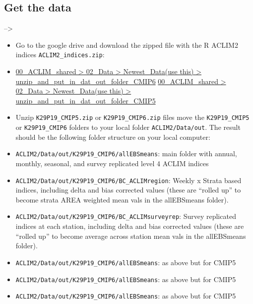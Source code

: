 \documentclass[
]{article}
\begin{document}
\hypertarget{get-the-data}{%
\subsection{Get the data}\label{get-the-data}}

--\textgreater{}

\begin{itemize}
\item
  Go to the google drive and download the zipped file with the R ACLIM2
  indices \texttt{ACLIM2\_indices.zip}:
\item
  \href{https://drive.google.com/drive/u/1/folders/1clPtrPCQMPcwqr8UE78_Sd2IGwyBuDcD}{00\_ACLIM\_shared
  \textgreater{} 02\_Data \textgreater{} Newest\_Data(use this)
  \textgreater{} unzip\_and\_put\_in\_dat\_out\_folder\_CMIP6}
  \href{https://drive.google.com/drive/u/1/folders/1t_JqDBQU-Fyy5nvIYRAmVcqzWi4mq7mk}{00\_ACLIM\_shared
  \textgreater{} 02\_Data \textgreater{} Newest\_Data(use this)
  \textgreater{} unzip\_and\_put\_in\_dat\_out\_folder\_CMIP5}
\item
  Unzip \texttt{K29P19\_CMIP5.zip} or \texttt{K29P19\_CMIP6.zip} files
  move the \texttt{K29P19\_CMIP5} or \texttt{K29P19\_CMIP6} folders to
  your local folder \texttt{ACLIM2/Data/out}. The result should be the
  following folder structure on your local computer:\\
\item
  \texttt{ACLIM2/Data/out/K29P19\_CMIP6/allEBSmeans}: main folder with
  annual, monthly, seasonal, and survey replicated level 4 ACLIM indices
\item
  \texttt{ACLIM2/Data/out/K29P19\_CMIP6/BC\_ACLIMregion}: Weekly x
  Strata based indices, including delta and bias corrected values (these
  are ``rolled up'' to become strata AREA weighted mean vals in the
  allEBSmeans folder).
\item
  \texttt{ACLIM2/Data/out/K29P19\_CMIP6/BC\_ACLIMsurveyrep}: Survey
  replicated indices at each station, including delta and bias corrected
  values (these are ``rolled up'' to become average across station mean
  vals in the allEBSmeans folder).
\item
  \texttt{ACLIM2/Data/out/K29P19\_CMIP6/allEBSmeans}: as above but for
  CMIP5
\item
  \texttt{ACLIM2/Data/out/K29P19\_CMIP6/allEBSmeans}: as above but for
  CMIP5
\item
  \texttt{ACLIM2/Data/out/K29P19\_CMIP6/allEBSmeans}: as above but for
  CMIP5
\end{itemize}
\end{document}

